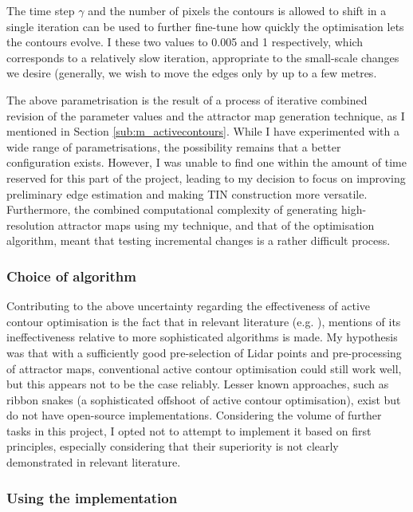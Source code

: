 The time step $\gamma$ and the number of pixels the contours is allowed to shift in a single iteration can be used to further fine-tune how quickly the optimisation lets the contours evolve. I these two values to 0.005 and 1 respectively, which corresponds to a relatively slow iteration, appropriate to the small-scale changes we desire (generally, we wish to move the edges only by up to a few metres.

The above parametrisation is the result of a process of iterative combined revision of the parameter values and the attractor map generation technique, as I mentioned in Section \ref{sub:m_activecontours}. While I have experimented with a wide range of parametrisations, the possibility remains that a better configuration exists. However, I was unable to find one within the amount of time reserved for this part of the project, leading to my decision to focus on improving preliminary edge estimation and making TIN construction more versatile. Furthermore, the combined computational complexity of generating high-resolution attractor maps using my technique, and that of the optimisation algorithm, meant that testing incremental changes is a rather difficult process.

\subsubsection{Choice of algorithm}

Contributing to the above uncertainty regarding the effectiveness of active contour optimisation is the fact that in relevant literature (e.g. \cite{boyko_funkhauser_2011}), mentions of its ineffectiveness relative to more sophisticated algorithms is made. My hypothesis was that with a sufficiently good pre-selection of Lidar points and pre-processing of attractor maps, conventional active contour optimisation could still work well, but this appears not to be the case reliably. Lesser known approaches, such as ribbon snakes (a sophisticated offshoot of active contour optimisation), exist but do not have open-source implementations. Considering the volume of further tasks in this project, I opted not to attempt to implement it based on first principles, especially considering that their superiority is not clearly demonstrated in relevant literature.

\subsubsection{Using the implementation}

